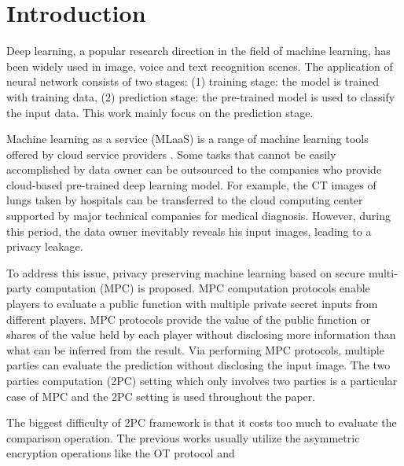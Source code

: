 \documentclass[letterpaper]{article} %
\begin{document}
    
\section{Introduction}
  


    \noindent Deep learning, a popular research direction in the field of machine learning, 
    has been widely used in image, voice and text recognition scenes. 
    The application of neural network consists of two stages:
    (1) training stage: the model is trained with training data,
    (2) prediction stage: the pre-trained model is used to classify the input data.
    This work mainly focus on the prediction stage.

    Machine learning as a service (MLaaS) is a range of machine learning tools offered by cloud service providers \cite{ChironCloud}. 
    Some tasks that cannot be easily accomplished by data owner can be outsourced to 
    the companies who provide cloud-based pre-trained deep learning model.
    For example, the CT images of lungs taken by hospitals 
    can be transferred to the cloud computing center
    supported by major technical companies for medical diagnosis.
    However, during this period, the data owner inevitably reveals his input images, 
    leading to a privacy leakage.
    
    To address this issue, privacy preserving machine learning based on secure multi-party
    computation (MPC) is proposed.
    MPC computation protocols enable players to evaluate a public function 
    with multiple private secret inputs from different players.
    MPC protocols provide the value of the public function or shares of the value held by each player
    without disclosing more information than what can be inferred from the result.
    Via performing MPC protocols, 
    multiple parties can evaluate the prediction without disclosing the input image.
    The two parties computation (2PC) setting which only involves two parties is a particular case of MPC 
    and the 2PC setting is used throughout the paper.

    The biggest difficulty of 2PC framework is that it costs too much to 
    evaluate the comparison operation. 
    The previous works usually utilize the asymmetric encryption
    operations like the  OT protocol and 

    
\end{document}
